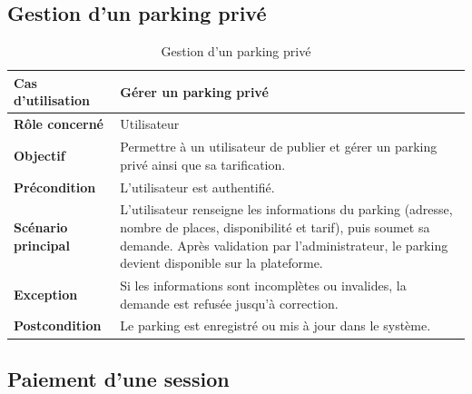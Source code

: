 \subsection{Gestion d'un parking privé}

\begin{table}[H]
\centering
\renewcommand{\arraystretch}{1.25}
\begin{tabular}{|p{}|p{}|}
\hline
\textbf{Cas d'utilisation} & Gérer un parking privé \\
\hline
\textbf{Rôle concerné} & Utilisateur \\
\hline
\textbf{Objectif} & Permettre à un utilisateur de publier et gérer un parking privé ainsi que sa tarification. \\
\hline
\textbf{Précondition} & L'utilisateur est authentifié. \\
\hline
\textbf{Scénario principal} & L'utilisateur renseigne les informations du parking (adresse, nombre de places, disponibilité et tarif), puis soumet sa demande. Après validation par l'administrateur, le parking devient disponible sur la plateforme. \\
\hline
\textbf{Exception} & Si les informations sont incomplètes ou invalides, la demande est refusée jusqu'à correction. \\
\hline
\textbf{Postcondition} & Le parking est enregistré ou mis à jour dans le système. \\
\hline
\end{tabular}
\caption{Gestion d'un parking privé}
\label{tab:private_parking}
\end{table}

\subsection{Paiement d'une session}

